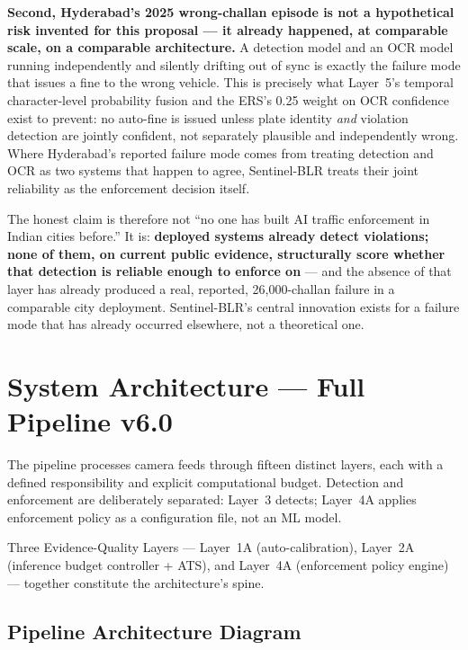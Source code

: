 \documentclass[11pt,a4paper]{article}
\begin{document}
\noindent\textbf{Second, Hyderabad's 2025 wrong-challan episode is not a hypothetical risk invented for this proposal --- it already happened, at comparable scale, on a comparable architecture.} A detection model and an OCR model running independently and silently drifting out of sync is exactly the failure mode that issues a fine to the wrong vehicle. This is precisely what Layer~5's temporal character-level probability fusion and the ERS's 0.25 weight on OCR confidence exist to prevent: no auto-fine is issued unless plate identity \emph{and} violation detection are jointly confident, not separately plausible and independently wrong. Where Hyderabad's reported failure mode comes from treating detection and OCR as two systems that happen to agree, Sentinel-BLR treats their joint reliability as the enforcement decision itself.

The honest claim is therefore not ``no one has built AI traffic enforcement in Indian cities before.'' It is: \textbf{deployed systems already detect violations; none of them, on current public evidence, structurally score whether that detection is reliable enough to enforce on} --- and the absence of that layer has already produced a real, reported, 26,000-challan failure in a comparable city deployment. Sentinel-BLR's central innovation exists for a failure mode that has already occurred elsewhere, not a theoretical one.

\section{System Architecture — Full Pipeline v6.0}

The pipeline processes camera feeds through fifteen distinct layers, each with a defined responsibility and explicit computational budget. Detection and enforcement are deliberately separated: Layer~3 detects; Layer~4A applies enforcement policy as a configuration file, not an ML model.

Three Evidence-Quality Layers --- Layer~1A (auto-calibration), Layer~2A (inference budget controller + ATS), and Layer~4A (enforcement policy engine) --- together constitute the architecture's spine.
\subsection*{Pipeline Architecture Diagram}
\end{document}
